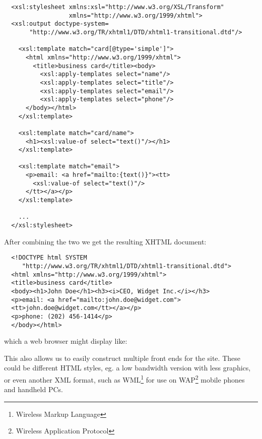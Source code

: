 \begin{verbatim}
  <xsl:stylesheet xmlns:xsl="http://www.w3.org/XSL/Transform"
                  xmlns="http://www.w3.org/1999/xhtml">
  <xsl:output doctype-system=
       "http://www.w3.org/TR/xhtml1/DTD/xhtml1-transitional.dtd"/>
  
    <xsl:template match="card[@type='simple']">
      <html xmlns="http://www.w3.org/1999/xhtml">
        <title>business card</title><body>
          <xsl:apply-templates select="name"/>
          <xsl:apply-templates select="title"/>
          <xsl:apply-templates select="email"/>
          <xsl:apply-templates select="phone"/>
      </body></html>
    </xsl:template>
  
    <xsl:template match="card/name">
      <h1><xsl:value-of select="text()"/></h1>
    </xsl:template>
  
    <xsl:template match="email">
      <p>email: <a href="mailto:{text()}"><tt>
        <xsl:value-of select="text()"/>
      </tt></a></p>
    </xsl:template> 

    ...
  </xsl:stylesheet>
\end{verbatim}

After combining the two we get the resulting XHTML document: 

\begin{verbatim}
  <!DOCTYPE html SYSTEM 
     "http://www.w3.org/TR/xhtml1/DTD/xhtml1-transitional.dtd">
  <html xmlns="http://www.w3.org/1999/xhtml">
  <title>business card</title>
  <body><h1>John Doe</h1><h3><i>CEO, Widget Inc.</i></h3>
  <p>email: <a href="mailto:john.doe@widget.com">
  <tt>john.doe@widget.com</tt></a></p>
  <p>phone: (202) 456-1414</p>
  </body></html>
\end{verbatim}

which a web browser might display like:

\begin{center}
\end{center}

This also allows us to easily construct multiple front ends for the site.  These could be different HTML styles, eg. a low bandwidth version with less graphics, or even another XML format, such as WML\footnote{Wireless Markup Language} for use on WAP\footnote{Wireless Application Protocol} mobile phones and handheld PCs.

